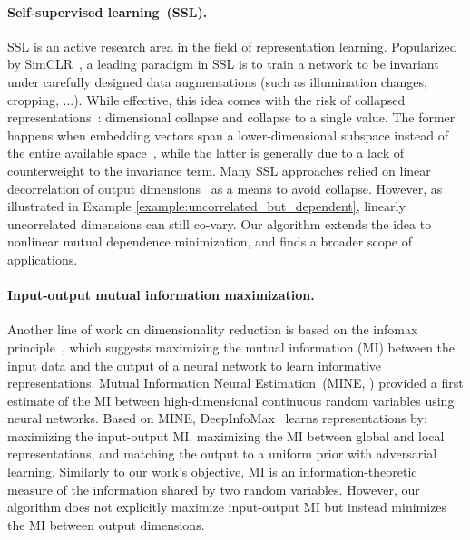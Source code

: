 \paragraph{Self-supervised learning~(SSL).} 
SSL is an active research area in the field of representation learning. 
Popularized by SimCLR~\citep{chen2020SimCLR_ssl}, a leading paradigm in SSL is to train a network to be invariant under carefully designed data augmentations (such as illumination changes, cropping, ...). 
While effective, this idea comes with the risk of collapsed representations~\citep{hua2021feature_decorr}: dimensional collapse and collapse to a single value. 
The former happens when embedding vectors span a lower-dimensional subspace instead of the entire available space~\citep{jing2021understand_ssl_dim_collapse}, while the latter is generally due to a lack of counterweight to the invariance term. 
Many SSL approaches relied on linear decorrelation of output dimensions~\citep{huang2018decorrelated_bn,zbontar2021barlow_ssl,ermolov2021whitening_WMSE_ssl,bardes2021vicreg_ssl} as a means to avoid collapse. 
However, as illustrated in Example \ref{example:uncorrelated_but_dependent}, linearly uncorrelated dimensions can still co-vary. %
Our algorithm extends the idea to nonlinear mutual dependence minimization, and finds a broader scope of applications. 

\paragraph{Input-output mutual information maximization.} 
Another line of work on dimensionality reduction is based on the infomax principle~\citep{linsker1988infomax,bell1995infomax}, which suggests maximizing the mutual information (MI) between the input data and the output of a neural network to learn informative representations. 
Mutual Information Neural Estimation~(MINE, \cite{belghazi2018MINE}) provided a first estimate of the MI between high-dimensional continuous random variables using neural networks. Based on MINE, DeepInfoMax~\citep{hjelm2019deep_infomax} learns representations by: maximizing the input-output MI, maximizing the MI between global and local representations, and matching the output to a uniform prior with adversarial learning. 
Similarly to our work's objective, MI is an information-theoretic measure of the information shared by two random variables. However, our algorithm does not explicitly maximize input-output MI but instead minimizes the MI between output dimensions.

